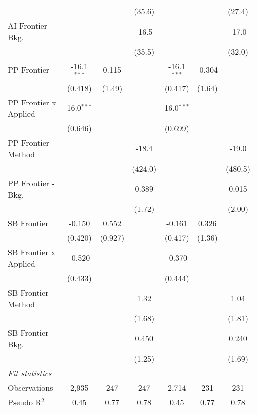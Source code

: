 \begin{tabular}{lcccccc}
                                &               &         & (35.6)        &               &        & (27.4)\\   
   AI Frontier - Bkg.           &               &         & -16.5         &               &        & -17.0\\   
                                &               &         & (35.5)        &               &        & (32.0)\\   
   PP Frontier                  & -16.1$^{***}$ & 0.115   &               & -16.1$^{***}$ & -0.304 &   \\   
                                & (0.418)       & (1.49)  &               & (0.417)       & (1.64) &   \\   
   PP Frontier x Applied        & 16.0$^{***}$  &         &               & 16.0$^{***}$  &        &   \\   
                                & (0.646)       &         &               & (0.699)       &        &   \\   
   PP Frontier - Method         &               &         & -18.4         &               &        & -19.0\\   
                                &               &         & (424.0)       &               &        & (480.5)\\   
   PP Frontier - Bkg.           &               &         & 0.389         &               &        & 0.015\\   
                                &               &         & (1.72)        &               &        & (2.00)\\   
   SB Frontier                  & -0.150        & 0.552   &               & -0.161        & 0.326  &   \\   
                                & (0.420)       & (0.927) &               & (0.417)       & (1.36) &   \\   
   SB Frontier x Applied        & -0.520        &         &               & -0.370        &        &   \\   
                                & (0.433)       &         &               & (0.444)       &        &   \\   
   SB Frontier - Method         &               &         & 1.32          &               &        & 1.04\\   
                                &               &         & (1.68)        &               &        & (1.81)\\   
   SB Frontier - Bkg.           &               &         & 0.450         &               &        & 0.240\\   
                                &               &         & (1.25)        &               &        & (1.69)\\   
   \midrule
   \emph{Fit statistics}\\
   Observations                 & 2,935         & 247     & 247           & 2,714         & 231    & 231\\  
   Pseudo R$^2$                 & 0.45          & 0.77    & 0.78          & 0.45          & 0.77   & 0.78\\  
   

\end{tabular}
